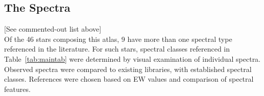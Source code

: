 \subsection{The Spectra}

\iffalse
	{\bf List of stars with multiple spectral type references in literature with notes:}\\
	\begin{itemize}
		\item{} CD-25 11942
		\item{}~~~match isn't great

		\item{} GSC 06213-00306AB
		\item{}~~~missing exact match in comparison plot

		\item{} GSC 06793-00797
		\item{}~~~match isn't great

		\item{} GSC 06793-01406
		\item{}~~~missing exact match in comparison plot

		\item{} GSC 06801-00186
		\item{}~~~missing exact match in comparison plot

		\item{} HIP 78977
		\item{}~~~could be F7 or F8

		\item{} HIP 79369
		\item{}~~~could be F1 or F0

		\item{} ScoPMS 44
		\item{}~~~match isn't great

		\item{} ScoPMS 214
		\item{}~~~match isn't great
	\end{itemize}
\fi

[See commented-out list above]\\


Of the 46 stars composing this atlas, 9 have more than one spectral type 
referenced in the literature.   For such stars, spectral classes referenced 
in Table~\ref{tab:maintab} were determined by visual examination of individual 
spectra.  Observed spectra were compared to existing libraries, with established 
spectral classes.  References were chosen based on EW values and comparison of 
spectral features.\\


\\
\\
\\
\\




